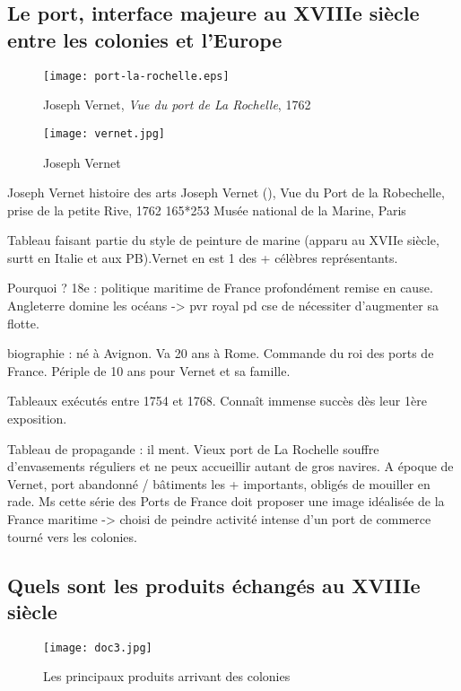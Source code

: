 \documentclass{beamer}
\begin{document}
\subsection{Le port, interface majeure au XVIIIe siècle entre les colonies et l'Europe}

\begin{frame}

\begin{figure}
\caption{Joseph Vernet, \textit{Vue du port de La Rochelle}, 1762}  
\texttt{[image: port-la-rochelle.eps]}

\end{figure}
\end{frame}

\begin{frame}
\begin{figure}
\caption{Joseph Vernet}  
\texttt{[image: vernet.jpg]}

\end{figure}
\end{frame}

\begin{frame}{Joseph Vernet histoire des arts}
Joseph Vernet (), Vue du Port de la Robechelle, prise de la petite Rive, 1762
165*253
Musée national de la Marine, Paris

Tableau faisant partie du style de peinture de marine (apparu au XVIIe siècle, surtt en Italie et aux PB).Vernet en est 1 des + célèbres représentants.

Pourquoi ? 18e : politique maritime de France profondément remise en cause. Angleterre domine les océans -> pvr royal pd cse de nécessiter d'augmenter sa flotte.

biographie : né à Avignon. Va 20 ans à Rome. Commande du roi des ports de France. Périple de 10 ans pour Vernet et sa famille.

Tableaux exécutés entre 1754 et 1768. Connaît immense succès dès leur 1ère exposition.
\end{frame}


\begin{frame}
Tableau de propagande : il ment. Vieux port de La Rochelle souffre d'envasements réguliers et ne peux accueillir autant de gros navires.  A époque de Vernet, port abandonné / bâtiments les + importants, obligés de mouiller en rade. Ms cette série des Ports de France doit proposer une image idéalisée de la France maritime -> choisi de peindre activité intense d'un port de commerce tourné vers les colonies.



\end{frame}

\subsection{Quels sont les produits échangés au XVIIIe siècle}

\begin{frame}
\begin{figure}
\caption{Les principaux produits arrivant des colonies}  
\texttt{[image: doc3.jpg]}

\end{figure}
\end{frame}



  
\end{document}
